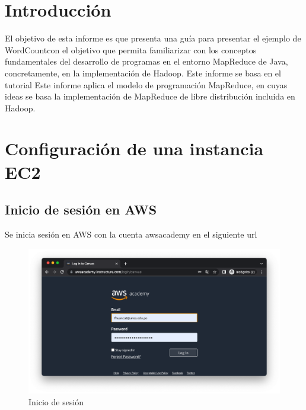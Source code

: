%
%

\section{Introducción}

El objetivo de esta informe es que presenta una guía para presentar el ejemplo de WordCountcon el objetivo que  permita familiarizar con los conceptos fundamentales del desarrollo de programas en el entorno MapReduce de Java, concretamente, en la implementación de Hadoop. Este informe se basa en el tutorial  Este informe aplica el modelo  de programación MapReduce, en cuyas ideas se basa la implementación de MapReduce de libre distribución incluida en Hadoop.

\section{Configuración de una instancia EC2}
\subsection{Inicio de sesión en AWS}

Se inicia sesión en AWS con la cuenta awsacademy en el siguiente url 

\begin{figure}[h]
	\centering
	\includegraphics[scale=.3] {img/00-login}
	\caption{Inicio de sesión}
	\label{fig:0}	
\end{figure}

